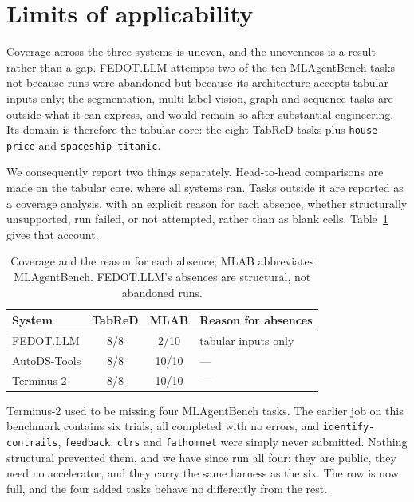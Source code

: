 \section{Limits of applicability}
\label{sec:scope}

\begin{sloppypar}
Coverage across the three systems is uneven, and the unevenness is a result
rather than a gap. FEDOT.LLM attempts two of the ten MLAgentBench tasks not
because runs were abandoned but because its architecture accepts tabular inputs
only; the segmentation, multi-label vision, graph and sequence tasks are outside
what it can express, and would remain so after substantial engineering. Its
domain is therefore the tabular core: the eight TabReD tasks plus
\texttt{house-price} and \texttt{spaceship-titanic}.
\end{sloppypar}

We consequently report two things separately. Head-to-head comparisons are made
on the tabular core, where all systems ran. Tasks outside it are reported as a
coverage analysis, with an explicit reason for each absence, whether structurally
unsupported, run failed, or not attempted, rather than as blank cells.
Table~\ref{tab:coverage} gives that account.

\begin{table}[t]
\centering
\caption{Coverage and the reason for each absence; MLAB abbreviates MLAgentBench. FEDOT.LLM's absences are structural, not abandoned runs.}
\label{tab:coverage}
\footnotesize
\setlength{\tabcolsep}{4pt}
\begin{tabular}{lccl}
\toprule
System & TabReD & MLAB & Reason for absences \\
\midrule
FEDOT.LLM    & 8/8 & 2/10  & tabular inputs only \\
AutoDS-Tools & 8/8 & 10/10 & --- \\
Terminus-2   & 8/8 & 10/10 & --- \\
\bottomrule
\end{tabular}
\end{table}

Terminus-2 used to be missing four MLAgentBench tasks. The earlier job on this
benchmark contains six trials, all completed with no errors, and
\texttt{identify-contrails}, \texttt{feedback}, \texttt{clrs} and
\texttt{fathomnet} were simply never submitted. Nothing structural prevented
them, and we have since run all four: they are public, they need no accelerator,
and they carry the same harness as the six. The row is now full, and the four
added tasks behave no differently from the rest.


